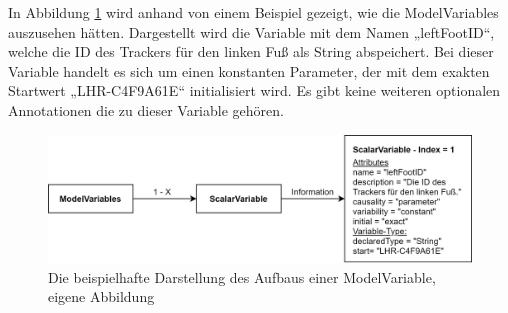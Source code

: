 In Abbildung \ref{fig:ModelVariables} wird anhand von einem Beispiel gezeigt, wie die ModelVariables auszusehen hätten. Dargestellt wird die Variable mit dem Namen „leftFootID“, welche die ID des Trackers für den linken Fuß als String abspeichert. Bei dieser Variable handelt es sich um einen konstanten Parameter, der mit dem exakten Startwert „LHR-C4F9A61E“ initialisiert wird. Es gibt keine weiteren optionalen Annotationen die zu dieser Variable gehören.
\begin{figure}[h]
	\centering
	\includegraphics[width=1\linewidth]{Bilder/A30_ModelVariables}
	\caption{Die beispielhafte Darstellung des Aufbaus einer ModelVariable, eigene Abbildung}
	\label{fig:ModelVariables}
\end{figure}
\newpage
